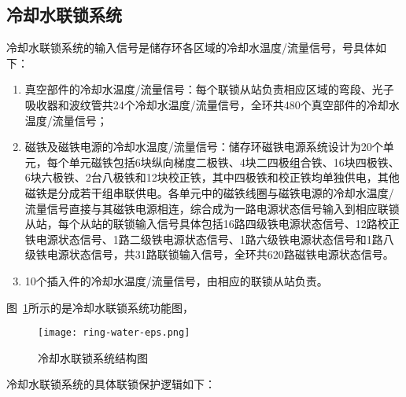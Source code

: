 \subsection{冷却水联锁系统}

冷却水联锁系统的输入信号是储存环各区域的冷却水温度/流量信号，号具体如下：

\begin{enumerate}

  \item 真空部件的冷却水温度/流量信号：每个联锁从站负责相应区域的弯段、光子吸收器和波纹管共24个冷却水温度/流量信号，全环共480个真空部件的冷却水温度/流量信号；

  \item 磁铁及磁铁电源的冷却水温度/流量信号：储存环磁铁电源系统设计为20个单元，每个单元磁铁包括6块纵向梯度二极铁、4块二四极组合铁、16块四极铁、6块六极铁、2台八极铁和12块校正铁，其中四极铁和校正铁均单独供电，其他磁铁是分成若干组串联供电。各单元中的磁铁线圈与磁铁电源的冷却水温度/流量信号直接与其磁铁电源相连，综合成为一路电源状态信号输入到相应联锁从站，每个从站的联锁输入信号具体包括16路四级铁电源状态信号、12路校正铁电源状态信号、1路二级铁电源状态信号、1路六级铁电源状态信号和1路八级铁电源状态信号，共31路联锁输入信号，全环共620路磁铁电源状态信号。

  \item 10个插入件的冷却水温度/流量信号，由相应的联锁从站负责。

\end{enumerate}


图~\ref{fig:ring-water-eps}所示的是冷却水联锁系统功能图，

\begin{figure}[!htb]
	\centering
	\texttt{[image: ring-water-eps.png]}
	\caption{冷却水联锁系统结构图}
	\label{fig:ring-water-eps}
\end{figure}


冷却水联锁系统的具体联锁保护逻辑如下：

